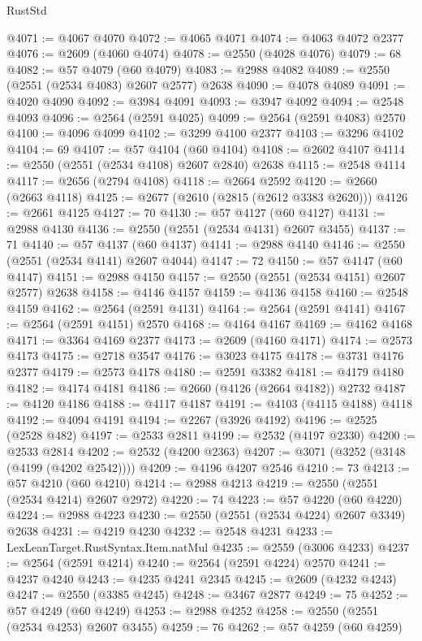 \begin{lexlean}{RustStd}
\begin{coremodule}
@4071 := @4067 @4070
@4072 := @4065 @4071
@4074 := @4063 @4072 @2377
@4076 := @2609 (@4060 @4074)
@4078 := @2550 (@4028 @4076)
@4079 := 68
@4082 := @57 @4079 (@60 @4079)
@4083 := @2988 @4082
@4089 := @2550 (@2551 (@2534 @4083) @2607 @2577) @2638
@4090 := @4078 @4089
@4091 := @4020 @4090
@4092 := @3984 @4091
@4093 := @3947 @4092
@4094 := @2548 @4093
@4096 := @2564 (@2591 @4025)
@4099 := @2564 (@2591 @4083) @2570
@4100 := @4096 @4099
@4102 := @3299 @4100 @2377
@4103 := @3296 @4102
@4104 := 69
@4107 := @57 @4104 (@60 @4104)
@4108 := @2602 @4107
@4114 := @2550 (@2551 (@2534 @4108) @2607 @2840) @2638
@4115 := @2548 @4114
@4117 := @2656 (@2794 @4108)
@4118 := @2664 @2592
@4120 := @2660 (@2663 @4118)
@4125 := @2677 (@2610 (@2815 (@2612 @3383 @2620)))
@4126 := @2661 @4125
@4127 := 70
@4130 := @57 @4127 (@60 @4127)
@4131 := @2988 @4130
@4136 := @2550 (@2551 (@2534 @4131) @2607 @3455)
@4137 := 71
@4140 := @57 @4137 (@60 @4137)
@4141 := @2988 @4140
@4146 := @2550 (@2551 (@2534 @4141) @2607 @4044)
@4147 := 72
@4150 := @57 @4147 (@60 @4147)
@4151 := @2988 @4150
@4157 := @2550 (@2551 (@2534 @4151) @2607 @2577) @2638
@4158 := @4146 @4157
@4159 := @4136 @4158
@4160 := @2548 @4159
@4162 := @2564 (@2591 @4131)
@4164 := @2564 (@2591 @4141)
@4167 := @2564 (@2591 @4151) @2570
@4168 := @4164 @4167
@4169 := @4162 @4168
@4171 := @3364 @4169 @2377
@4173 := @2609 (@4160 @4171)
@4174 := @2573 @4173
@4175 := @2718 @3547
@4176 := @3023 @4175
@4178 := @3731 @4176 @2377
@4179 := @2573 @4178
@4180 := @2591 @3382
@4181 := @4179 @4180
@4182 := @4174 @4181
@4186 := @2660 (@4126 (@2664 @4182)) @2732
@4187 := @4120 @4186
@4188 := @4117 @4187
@4191 := @4103 (@4115 @4188) @4118
@4192 := @4094 @4191
@4194 := @2267 (@3926 @4192)
@4196 := @2525 (@2528 @482)
@4197 := @2533 @2811
@4199 := @2532 (@4197 @2330)
@4200 := @2533 @2814
@4202 := @2532 (@4200 @2363)
@4207 := @3071 (@3252 (@3148 (@4199 (@4202 @2542))))
@4209 := @4196 @4207 @2546
@4210 := 73
@4213 := @57 @4210 (@60 @4210)
@4214 := @2988 @4213
@4219 := @2550 (@2551 (@2534 @4214) @2607 @2972)
@4220 := 74
@4223 := @57 @4220 (@60 @4220)
@4224 := @2988 @4223
@4230 := @2550 (@2551 (@2534 @4224) @2607 @3349) @2638
@4231 := @4219 @4230
@4232 := @2548 @4231
@4233 := LexLeanTarget.RustSyntax.Item.natMul
@4235 := @2559 (@3006 @4233)
@4237 := @2564 (@2591 @4214)
@4240 := @2564 (@2591 @4224) @2570
@4241 := @4237 @4240
@4243 := @4235 @4241 @2345
@4245 := @2609 (@4232 @4243)
@4247 := @2550 (@3385 @4245)
@4248 := @3467 @2877
@4249 := 75
@4252 := @57 @4249 (@60 @4249)
@4253 := @2988 @4252
@4258 := @2550 (@2551 (@2534 @4253) @2607 @3455)
@4259 := 76
@4262 := @57 @4259 (@60 @4259)

\end{coremodule}
\end{lexlean}
